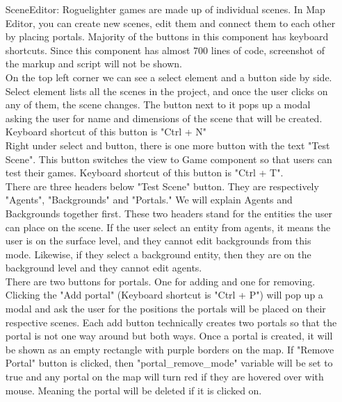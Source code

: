 \documentclass{article}
\begin{document}
\begin{itemize}
    \item[SceneEditor:] Roguelighter games are made up of individual scenes. In Map Editor, you can create new scenes, edit them and connect them to each other by placing portals. Majority of the buttons in this component has keyboard shortcuts. Since this component has almost 700 lines of code, screenshot of the markup and script will not be shown.\\

    On the top left corner we can see a select element and a button side by side. Select element lists all the scenes in the project, and once the user clicks on any of them, the scene changes. The button next to it pops up a modal asking the user for name and dimensions of the scene that will be created. Keyboard shortcut of this button is "Ctrl + N" \\ 

    Right under select and button, there is one more button with the text "Test Scene". This button switches the view to Game component so that users can test their games. Keyboard shortcut of this button is "Ctrl + T".\\
     
    There are three headers below "Test Scene" button. They are respectively "Agents", "Backgrounds" and "Portals." We will explain Agents and Backgrounds together first. These two headers stand for the entities the user can place on the scene. If the user select an entity from agents, it means the user is on the surface level, and they cannot edit backgrounds from this mode. Likewise, if they select a background entity, then they are on the background level and they cannot edit agents.\\

    There are two buttons for portals. One for adding and one for removing. Clicking the "Add portal" (Keyboard shortcut is "Ctrl + P") will pop up a modal and ask the user for the positions the portals will be placed on their respective scenes. Each add button technically creates two portals so that the portal is not one way around but both ways. Once a portal is created, it will be shown as an empty rectangle with purple borders on the map. If "Remove Portal" button is clicked, then "portal\_remove\_mode" variable will be set to true and any portal on the map will turn red if they are hovered over with mouse. Meaning the portal will be deleted if it is clicked on.\\ 
    

\end{itemize}
\end{document}

